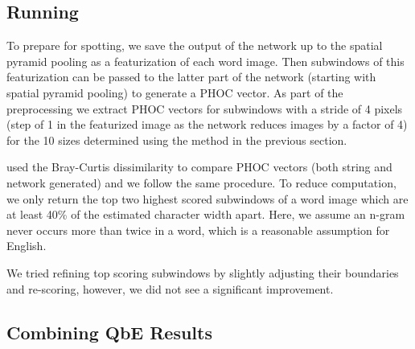 \documentclass[ms,electronic,twosidetoc,letterpaper,chaptercenter,parttop,lol,lof,lot]{byumsphd}
\begin{document}
\subsection{Running}

To prepare for spotting, we save the output of the network up to the spatial pyramid pooling as a featurization of each word image. Then subwindows of this featurization can be passed to the latter part of the network (starting with spatial pyramid pooling) to generate a PHOC vector. As part of the preprocessing we extract PHOC vectors for subwindows with a stride of 4 pixels (step of 1 in the featurized image as the network reduces images by a factor of 4) for the 10 sizes determined using the method in the previous section.


\cite{sudholt2016} used the Bray-Curtis dissimilarity to compare PHOC vectors (both string and network generated) and we follow the same procedure.
To reduce computation, we only return the top two highest scored subwindows of a word image which are at least 40\% of the estimated character width apart. Here, we assume an n-gram never occurs more than twice in a word, which is a reasonable assumption for English.


We tried refining top scoring subwindows by slightly adjusting their boundaries and re-scoring, however, we did not see a significant improvement. %

\subsection{Combining QbE Results}\label{combine}
\end{document}
